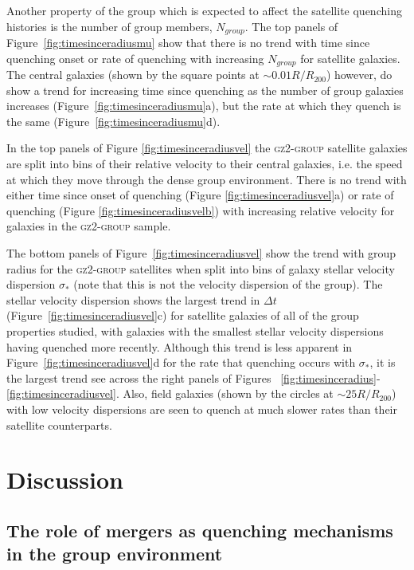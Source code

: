Another property of the group which is expected to affect the satellite quenching histories is the number of group members, $N_{group}$. The top panels of Figure~\ref{fig:timesinceradiusmu} show that there is no trend with time since quenching onset or rate of quenching with increasing $N_{group}$ for satellite galaxies. The central galaxies (shown by the square points at $\sim 0.01 R/R_{200}$) however, do show a trend for increasing time since quenching as the number of group galaxies increases (Figure~\ref{fig:timesinceradiusmu}a), but the rate at which they quench is the same (Figure~\ref{fig:timesinceradiusmu}d).

In the top panels of Figure \ref{fig:timesinceradiusvel} the \textsc{gz2-group} satellite galaxies are split into bins of their relative velocity to their central galaxies, i.e. the speed at which they move through the dense group environment. There is no trend with either time since onset of quenching (Figure \ref{fig:timesinceradiusvel}a) or rate of quenching (Figure \ref{fig:timesinceradiusvelb}) with increasing relative velocity for galaxies in the \textsc{gz2-group} sample.

The bottom panels of Figure~\ref{fig:timesinceradiusvel} show the trend with group radius for the \textsc{gz2-group} satellites when split into bins of galaxy stellar velocity dispersion $\sigma_*$ (note that this is not the velocity dispersion of the group). The stellar velocity dispersion shows the largest trend in $\Delta t$ (Figure~\ref{fig:timesinceradiusvel}c) for satellite galaxies of all of the group properties studied, with galaxies with the smallest stellar velocity dispersions having quenched more recently. Although this trend is less apparent in Figure~\ref{fig:timesinceradiusvel}d for the rate that quenching occurs with $\sigma_*$, it is the largest trend see across the right panels of Figures ~\ref{fig:timesinceradius}-\ref{fig:timesinceradiusvel}. Also, field galaxies (shown by the circles at $\sim 25 R/R_{200}$) with low velocity dispersions are seen to quench at much slower rates than their satellite counterparts.


\section{Discussion}\label{sec:disc}

\subsection{The role of mergers as quenching mechanisms in the group environment}\label{sec:rolemergerenv}

